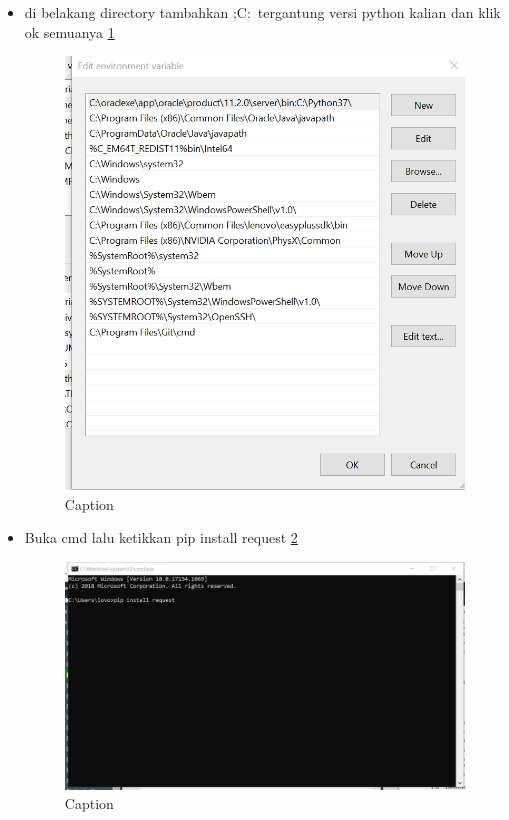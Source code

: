 \begin{enumerate}
\begin{itemize}
        \item di belakang directory tambahkan ;C:\ tergantung versi python kalian dan klik ok semuanya \ref{capture8}
        \begin{figure} [h]
            \centering
            \includegraphics[scale=0.3]{figures/Capture8.PNG}
            \caption{Caption}
            \label{capture8}
        \end{figure}
        
        \item Buka cmd lalu ketikkan pip install request \ref{capture9}
        \begin{figure} [h]
            \centering
            \includegraphics[scale=0.3]{figures/Capture9.PNG}
            \caption{Caption}
            \label{capture9}
        \end{figure}
        

\end{itemize}
\end{enumerate}
